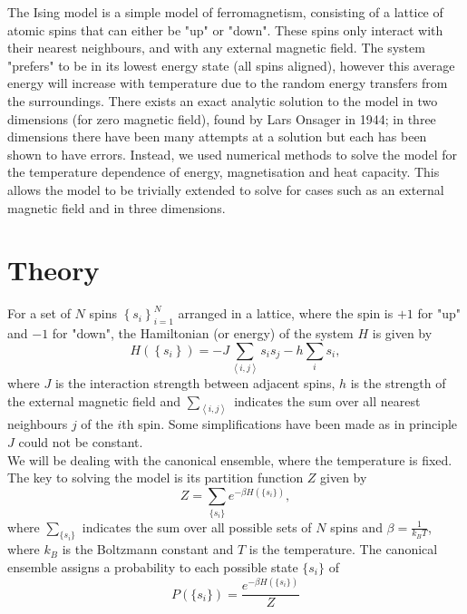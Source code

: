 \documentclass[11pt]{article}
\begin{document}
	The Ising model is a simple model of ferromagnetism, consisting of a lattice of atomic spins that can either be "up" or "down". These spins only interact with their nearest neighbours, and with any external magnetic field. The system "prefers" to be in its lowest energy state (all spins aligned), however this average energy will increase with temperature due to the random energy transfers from the surroundings. There exists an exact analytic solution to the model in two dimensions (for zero magnetic field)\cite{onsager_solution}, found by Lars Onsager in 1944; in three dimensions there have been many attempts at a solution\cite{das1970exact, lou2000three, zhang2007conjectures, zhang2021exact} but each has been shown to have errors. Instead, we used numerical methods to solve the model for the temperature dependence of energy, magnetisation and heat capacity. This allows the model to be trivially extended to solve for cases such as an external magnetic field and in three dimensions.
	
	\section{Theory}
	
	For a set of $N$ spins $\left\{s_i\right\}_{i=1}^N$ arranged in a lattice, where the spin is $+1$ for "up" and $-1$ for "down", the Hamiltonian (or energy)	of the system $H$ is given by\cite{Baierlein_1999} %
	\begin{equation}
		H\left(\left\{s_i\right\}\right) = -J\sum_{\left<i,j\right>}s_is_j - h\sum_i s_i,
	\end{equation}
	where $J$ is the interaction strength between adjacent spins, $h$ is the strength of the external magnetic field and $\sum_{\left<i,j\right>}$ indicates the sum over all nearest neighbours $j$ of the $i$th spin. Some simplifications have been made as in principle $J$ could not be constant. \\
	
	We will be dealing with the canonical ensemble, where the temperature is fixed. The key to solving the model is its partition function $Z$ given by
	\begin{equation} \label{eq:PartitionFunction}
		Z = \sum_{\{s_i\}} e^{-\beta H(\{s_i\})},
	\end{equation}
	where $\sum_{\{s_i\}}$ indicates the sum over all possible sets of $N$ spins and $\beta = \frac{1}{k_B T}$, where $k_B$ is the Boltzmann constant and $T$ is the temperature. The canonical ensemble assigns a probability to each possible state $\{s_i\}$ of
	\begin{equation} \label{eq:Probability}
		P(\{s_i\}) = \frac{e^{-\beta H(\{s_i\})}}{Z}
	\end{equation}
\end{document}
